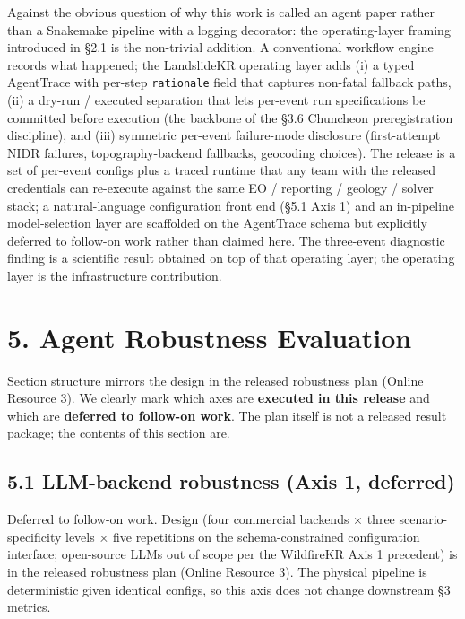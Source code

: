 \documentclass[11pt,a4paper]{article}
\begin{document}
Against the obvious question of why this work is called an agent paper rather than a Snakemake pipeline with a logging decorator: the operating-layer framing introduced in §2.1 is the non-trivial addition. A conventional workflow engine records what happened; the LandslideKR operating layer adds (i) a typed AgentTrace with per-step \texttt{rationale} field that captures non-fatal fallback paths, (ii) a dry-run / executed separation that lets per-event run specifications be committed before execution (the backbone of the §3.6 Chuncheon preregistration discipline), and (iii) symmetric per-event failure-mode disclosure (first-attempt NIDR failures, topography-backend fallbacks, geocoding choices). The release is a set of per-event configs plus a traced runtime that any team with the released credentials can re-execute against the same EO / reporting / geology / solver stack; a natural-language configuration front end (§5.1 Axis 1) and an in-pipeline model-selection layer are scaffolded on the AgentTrace schema but explicitly deferred to follow-on work rather than claimed here. The three-event diagnostic finding is a scientific result obtained on top of that operating layer; the operating layer is the infrastructure contribution.

\section{5. Agent Robustness Evaluation}\label{agent-robustness-evaluation}

Section structure mirrors the design in the released robustness plan (Online Resource 3). We clearly mark which axes are \textbf{executed in this release} and which are \textbf{deferred to follow-on work}. The plan itself is not a released result package; the contents of this section are.

\subsection{5.1 LLM-backend robustness (Axis 1, deferred)}\label{llm-backend-robustness-axis-1-deferred}

Deferred to follow-on work. Design (four commercial backends × three scenario-specificity levels × five repetitions on the schema-constrained configuration interface; open-source LLMs out of scope per the WildfireKR Axis 1 precedent) is in the released robustness plan (Online Resource 3). The physical pipeline is deterministic given identical configs, so this axis does not change downstream §3 metrics.
\end{document}
